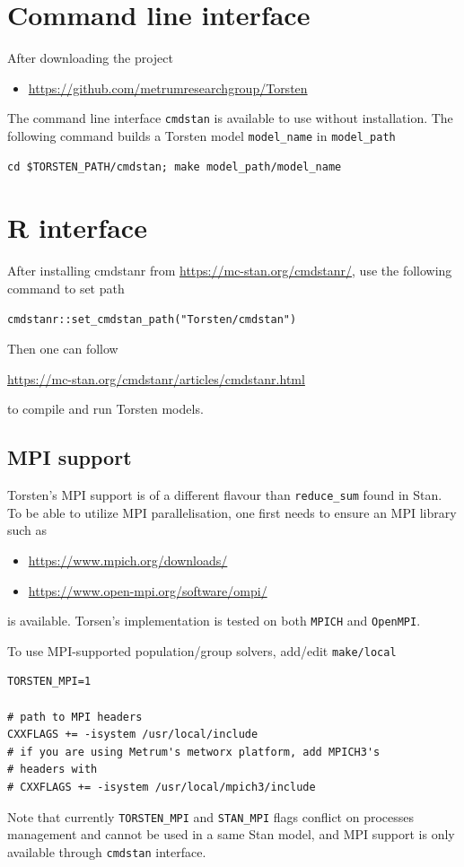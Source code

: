 \documentclass[11pt, reqno, oneside]{amsbook}
\numberwithin{equation}{chapter}
\numberwithin{figure}{chapter}
\numberwithin{table}{chapter}
\theoremstyle{remark}
\begin{document}
\section{Command line interface}
\label{sec:org37fe853}
After downloading the project 

\begin{itemize}
\item \url{https://github.com/metrumresearchgroup/Torsten}
\end{itemize}

The command line interface \texttt{cmdstan} is available to use without
installation. The following command
builds a Torsten model \texttt{model\_name} in \texttt{model\_path}
\begin{verbatim}
cd $TORSTEN_PATH/cmdstan; make model_path/model_name
\end{verbatim}

\section{R interface}
\label{sec:org27e6bba}
After installing cmdstanr from \url{https://mc-stan.org/cmdstanr/}, use the
following command to set path 
\begin{verbatim}
cmdstanr::set_cmdstan_path("Torsten/cmdstan")
\end{verbatim}
Then one can follow 

\url{https://mc-stan.org/cmdstanr/articles/cmdstanr.html}

to compile and run Torsten models.

\subsection{MPI support}
\label{sec:orgc27b296}
Torsten's MPI support is of a different flavour than
\texttt{reduce\_sum} found in Stan. To be able to utilize MPI
parallelisation, one first needs to ensure an MPI library
such as 
\begin{itemize}
\item \url{https://www.mpich.org/downloads/}
\item \url{https://www.open-mpi.org/software/ompi/}
\end{itemize}
is available. Torsen's implementation is tested on
both \texttt{MPICH} and \texttt{OpenMPI}.

To use MPI-supported population/group solvers,
add/edit \texttt{make/local}
\begin{verbatim}
TORSTEN_MPI=1

# path to MPI headers
CXXFLAGS += -isystem /usr/local/include
# if you are using Metrum's metworx platform, add MPICH3's
# headers with
# CXXFLAGS += -isystem /usr/local/mpich3/include
\end{verbatim}
Note that currently \texttt{TORSTEN\_MPI} and \texttt{STAN\_MPI} flags
conflict on processes management and cannot be used in a
same Stan model, and MPI support is only available through \texttt{cmdstan}
interface.
\end{document}
